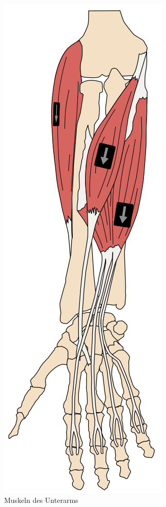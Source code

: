 \documentclass[final,20pt]{beamer}
\newlength{\sepwidth}
\newlength{\colwidth}
\newcommand{\separatorcolumn}{\begin{column}{\sepwidth}\end{column}}
\begin{document}
\begin{frame}[t]
\begin{columns}[t]
\begin{column}{\colwidth}
	\begin{figure}
		\centering \includegraphics[scale=0.4]{unterarm-muskeln.png}
		\caption{Muskeln des Unterarms}
	\end{figure}
\end{column}

\separatorcolumn
\end{columns}
\end{frame}
\end{document}
